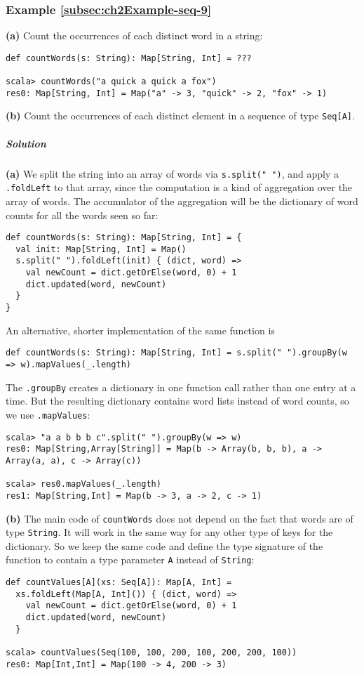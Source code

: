 \subsubsection{Example \label{subsec:ch2Example-seq-9}\ref{subsec:ch2Example-seq-9}}

\textbf{(a)} Count the occurrences of each distinct word in a string:
\begin{lstlisting}
def countWords(s: String): Map[String, Int] = ???

scala> countWords("a quick a quick a fox")
res0: Map[String, Int] = Map("a" -> 3, "quick" -> 2, "fox" -> 1)
\end{lstlisting}
\textbf{(b)} Count the occurrences of each distinct element in a sequence
of type \lstinline!Seq[A]!.

\subparagraph{Solution}

\textbf{(a)} We split the string into an array of words via \lstinline!s.split(" ")!,
and apply a \lstinline!.foldLeft! to that array, since the computation
is a kind of aggregation over the array of words. The accumulator
of the aggregation will be the dictionary of word counts for all the
words seen so far:
\begin{lstlisting}
def countWords(s: String): Map[String, Int] = {
  val init: Map[String, Int] = Map()
  s.split(" ").foldLeft(init) { (dict, word) =>
    val newCount = dict.getOrElse(word, 0) + 1
    dict.updated(word, newCount)
  }
}
\end{lstlisting}
An alternative, shorter implementation of the same function is
\begin{lstlisting}
def countWords(s: String): Map[String, Int] = s.split(" ").groupBy(w => w).mapValues(_.length)
\end{lstlisting}
The \lstinline!.groupBy! creates a dictionary in one function call
rather than one entry at a time. But the resulting dictionary contains
word lists instead of word counts, so we use \lstinline!.mapValues!:
\begin{lstlisting}
scala> "a a b b b c".split(" ").groupBy(w => w)
res0: Map[String,Array[String]] = Map(b -> Array(b, b, b), a -> Array(a, a), c -> Array(c))

scala> res0.mapValues(_.length)
res1: Map[String,Int] = Map(b -> 3, a -> 2, c -> 1)
\end{lstlisting}

\textbf{(b)} The main code of \lstinline!countWords! does not depend
on the fact that words are of type \lstinline!String!. It will work
in the same way for any other type of keys for the dictionary. So
we keep the same code and define the type signature of the function
to contain a type parameter \lstinline!A! instead of \lstinline!String!:
\begin{lstlisting}
def countValues[A](xs: Seq[A]): Map[A, Int] =
  xs.foldLeft(Map[A, Int]()) { (dict, word) =>
    val newCount = dict.getOrElse(word, 0) + 1
    dict.updated(word, newCount)
  }

scala> countValues(Seq(100, 100, 200, 100, 200, 200, 100))
res0: Map[Int,Int] = Map(100 -> 4, 200 -> 3)
\end{lstlisting}


